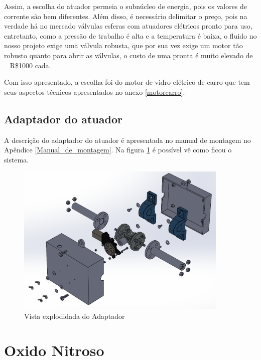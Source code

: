 \par Assim, a escolha do atuador permeia o subnúcleo de energia, pois os valores de corrente são bem diferentes. Além disso, é necessário delimitar o preço, pois na verdade há no mercado válvulas esferas com atuadores elétricos pronto para uso, entretanto, como a pressão de trabalho é alta e a temperatura é baixa, o fluido no nosso projeto exige uma válvula robusta, que por sua vez exige um motor tão robusto quanto para abrir as válvulas, o custo de uma pronta é muito elevado de ~ R\$1000 cada. 

\par Com isso apresentado, a escolha foi do motor de vidro elétrico de carro que tem seus aspectos técnicos apresentados no anexo \ref{motorcarro}.

\subsection{Adaptador do atuador}
\label{subsec:atuador}
\par A descrição do adaptador do atuador é apresentada no manual de montagem no Apêndice \ref{Manual_de_montagem}. Na figura \ref{fig:adap} é possível vê como ficou o sistema.

\begin{figure}[H]
\centering
\includegraphics[width=0.9\textwidth]{figuras/explodida_valvula.png}
\caption{Vista explodidada do Adaptador}
\label{fig:adap}
\end{figure}


\section{Oxido Nitroso}
\label{sec:n2o}

